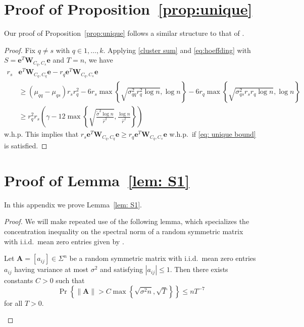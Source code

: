 \documentclass[twoside,11pt]{article}
\DeclareMathOperator{\pr}{Pr}
\newcommand{\e}{\bs {e}}
\newcommand{\bs}{\boldsymbol}
\newcommand{\W}{\bs {W}}
\newcommand{\0}{\bs{0}}
\newcommand{\rbra}[1]{\ensuremath{\left( #1 \right)}} %
\newcommand{\bra}[1]{\ensuremath{\left\{ #1 \right\}}} %
\newcommand{\eq}[1]{\(#1\)}
\begin{document}
{\section{Proof of Proposition~\ref{prop:unique}}
\label{A_unique}



Our proof of Proposition~\ref{prop:unique} follows a similar structure to that of \citet[Lemma~4.4]{ames2014guaranteed}.

\begin{proof}
	Fix \eq{q \neq s} with \eq{q \in 1, \dots, k}.
	Applying \eqref{cluster sum} and \eqref{eq:hoeffding}
	with $S = \e^T \W_{C_q, C_s} \e$ and $T = n$,
	we have
	\begin{align*}
		r_s &\e^T \W_{C_q, C_q} \e
		- r_q \e^T \W_{C_q, C_s} \e \\
		& \ge (\mu_{qq} - \mu_{qs}) r_s r_q^2
		- 6 r_s \max \bra{ \sqrt{ \sigma_{qq}^2 r_q^2 \log n}, \log n}
		- 6 r_q \max \bra{ \sqrt{\sigma_{qs}^2 r_s r_q \log n}, \log n} \\
		&\ge r_q^2 r_s \rbra{ \gamma - 12 \max \bra{ \sqrt{\frac{\tilde\sigma^2 \log n}{\hat r^2}}, \frac{\log n}{\hat r^2}} }
	\end{align*}
	w.h.p.
	This implies that $r_s \e^T \W_{C_q, C_q} \e \ge r_q \e^T \W_{C_q, C_s} \e$ w.h.p.~if \eqref{eq: unique bound} is satisfied.

\end{proof}




\section{Proof of  Lemma~\ref{lem: S1}} %
\label{A_S1_bound}

In this appendix we prove Lemma~\ref{lem: S1}.
\begin{proof}
We will make repeated use of the following
lemma, which specializes the concentration inequality on the spectral norm
of a random symmetric matrix with i.i.d.~mean zero entries given by \citet[Corollary 3.12]{bandeira2016sharp}.

\begin{lemma} \label{lem: tropp tech}
	Let $\bs{A} = [a_{ij}] \in \Sigma^n$ be a random symmetric matrix with i.i.d.~mean zero entries $a_{ij}$ having variance at most
	$\sigma^2$ and satisfying $|a_{ij}| \leq 1$. Then there exists constants $C> 0$ such that
	\begin{equation} \label{eq:sparse_lemma}
	\pr \left\lbrace \|\bs{A}\| > C \max\left\lbrace \sqrt{ \sigma^2 n}, \sqrt{T} \right\rbrace \right\rbrace \leq nT^{-7}
	\end{equation}
	for all $T > 0$.
\end{lemma}


\end{proof}}
\end{document}
